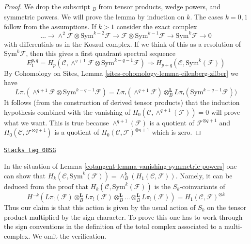 \begin{proof}
We drop the subscript ${}_{\underline{B}}$ from tensor products, wedge powers,
and symmetric powers. We will prove the lemma by induction on $k$.
The cases $k = 0, 1$ follow from the assumptions. If $k > 1$ consider
the exact complex
$$
\ldots \to
\wedge^2\mathcal{F} \otimes \text{Sym}^{k - 2}\mathcal{F} \to
\mathcal{F} \otimes \text{Sym}^{k - 1}\mathcal{F} \to
\text{Sym}^k\mathcal{F} \to 0
$$
with differentials as in the Koszul complex. If we think of this as a
resolution of $\text{Sym}^k\mathcal{F}$, then this gives a first quadrant
spectral sequence
$$
E_1^{p, q} =
H_p(\mathcal{C},
\wedge^{q + 1}\mathcal{F} \otimes \text{Sym}^{k - q - 1}\mathcal{F})
\Rightarrow
H_{p + q}(\mathcal{C}, \text{Sym}^k(\mathcal{F}))
$$
By Cohomology on Sites, Lemma \ref{sites-cohomology-lemma-eilenberg-zilber}
we have
$$
L\pi_!(\wedge^{q + 1}\mathcal{F} \otimes \text{Sym}^{k - q - 1}\mathcal{F}) =
L\pi_!(\wedge^{q + 1}\mathcal{F}) \otimes_B^\mathbf{L}
L\pi_!(\text{Sym}^{k - q - 1}\mathcal{F}))
$$
It follows (from the construction of derived tensor products) that
the induction hypothesis combined with the vanishing
of $H_0(\mathcal{C}, \wedge^{q + 1}(\mathcal{F})) = 0$ will prove what we want.
This is true because $\wedge^{q + 1}(\mathcal{F})$ is a quotient
of $\mathcal{F}^{\otimes q + 1}$ and
$H_0(\mathcal{C}, \mathcal{F}^{\otimes q + 1})$
is a quotient of $H_0(\mathcal{C}, \mathcal{F})^{\otimes q + 1}$
which is zero.
\end{proof}

\begin{remark}
\label{cotangent-remark-first-homology-symmetric-power}
\href{https://stacks.math.columbia.edu/tag/08SG}{\texttt{Stacks tag 08SG}}

In the situation of Lemma \ref{cotangent-lemma-vanishing-symmetric-powers}
one can show that
$H_k(\mathcal{C}, \text{Sym}^k(\mathcal{F})) =
\wedge^k_B(H_1(\mathcal{C}, \mathcal{F}))$.
Namely, it can be deduced from the proof that
$H_k(\mathcal{C}, \text{Sym}^k(\mathcal{F}))$ is the $S_k$-coinvariants
of
$$
H^{-k}(L\pi_!(\mathcal{F}) \otimes_B^\mathbf{L}
L\pi_!(\mathcal{F}) \otimes_B^\mathbf{L}
\ldots \otimes_B^\mathbf{L} L\pi_!(\mathcal{F})) =
H_1(\mathcal{C}, \mathcal{F})^{\otimes k}
$$
Thus our claim is that this action is given by the usual action
of $S_k$ on the tensor product multiplied by the sign character.
To prove this one has to work through the sign conventions
in the definition of the total complex associated to a
multi-complex. We omit the verification.
\end{remark}

